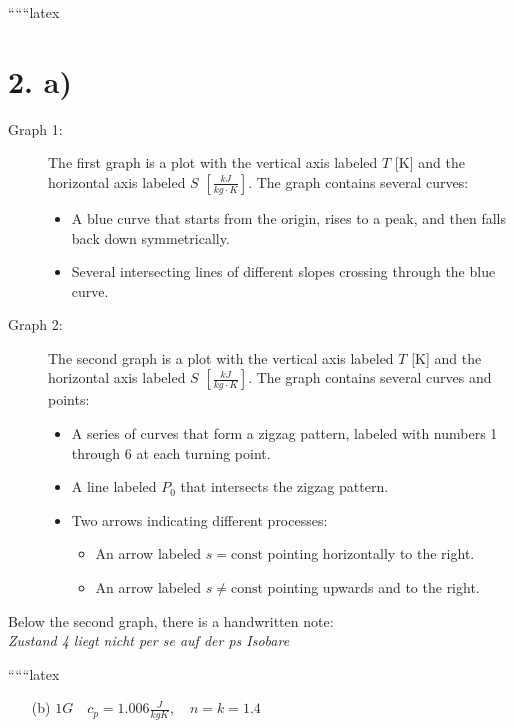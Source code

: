 
``````latex


\section*{2. a)}

\begin{description}
    \item[Graph 1:] The first graph is a plot with the vertical axis labeled \( T \) [K] and the horizontal axis labeled \( S \) \(\left[\frac{kJ}{kg \cdot K}\right]\). The graph contains several curves:
    \begin{itemize}
        \item A blue curve that starts from the origin, rises to a peak, and then falls back down symmetrically.
        \item Several intersecting lines of different slopes crossing through the blue curve.
    \end{itemize}
    
    \item[Graph 2:] The second graph is a plot with the vertical axis labeled \( T \) [K] and the horizontal axis labeled \( S \) \(\left[\frac{kJ}{kg \cdot K}\right]\). The graph contains several curves and points:
    \begin{itemize}
        \item A series of curves that form a zigzag pattern, labeled with numbers 1 through 6 at each turning point.
        \item A line labeled \( P_0 \) that intersects the zigzag pattern.
        \item Two arrows indicating different processes:
        \begin{itemize}
            \item An arrow labeled \( s = \text{const} \) pointing horizontally to the right.
            \item An arrow labeled \( s \neq \text{const} \) pointing upwards and to the right.
        \end{itemize}
    \end{itemize}
\end{description}

\noindent Below the second graph, there is a handwritten note: \\
\textit{Zustand 4 liegt nicht per se auf der ps Isobare}

``````latex


\begin{itemize}
    \item[(b)] $1G \quad c_p = 1.006 \frac{J}{kgK}, \quad n = k = 1.4$
\end{itemize}

